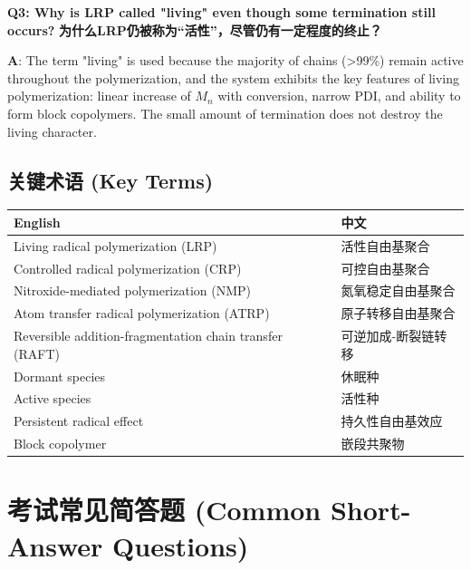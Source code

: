 \documentclass[12pt,a4paper]{ctexart}
\begin{document}
\textbf{Q3: Why is LRP called "living" even though some termination still occurs?}  
\textbf{为什么LRP仍被称为“活性”，尽管仍有一定程度的终止？}

\textbf{A}: The term "living" is used because the majority of chains (>99\%) remain active throughout the polymerization, and the system exhibits the key features of living polymerization: linear increase of $M_n$ with conversion, narrow PDI, and ability to form block copolymers. The small amount of termination does not destroy the living character.

\subsection{关键术语 (Key Terms)}

\begin{longtable}{p{5.5cm}p{5.5cm}}
\toprule
\textbf{English} & \textbf{中文} \\
\midrule
Living radical polymerization (LRP) & 活性自由基聚合 \\
Controlled radical polymerization (CRP) & 可控自由基聚合 \\
Nitroxide-mediated polymerization (NMP) & 氮氧稳定自由基聚合 \\
Atom transfer radical polymerization (ATRP) & 原子转移自由基聚合 \\
Reversible addition-fragmentation chain transfer (RAFT) & 可逆加成-断裂链转移 \\
Dormant species & 休眠种 \\
Active species & 活性种 \\
Persistent radical effect & 持久性自由基效应 \\
Block copolymer & 嵌段共聚物 \\
\bottomrule
\end{longtable}

\section{考试常见简答题 (Common Short-Answer Questions)}
\end{document}
